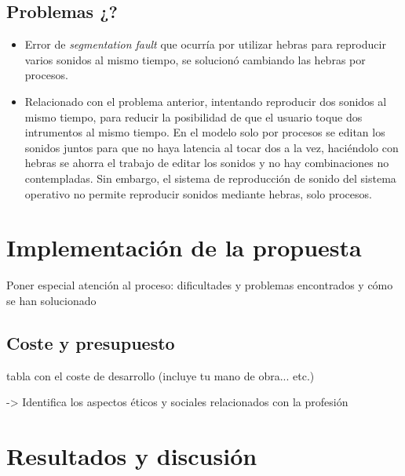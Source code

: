 \documentclass{article}
\begin{document}
 \subsection{Problemas ¿?}
 \begin{itemize}
     \item
        Error de \textit{segmentation fault} que ocurría por utilizar hebras para reproducir
        varios sonidos al mismo tiempo, se solucionó cambiando las hebras por procesos.
     \item
        Relacionado con el problema anterior, intentando reproducir dos sonidos al mismo tiempo, para reducir
        la posibilidad de que el usuario toque dos intrumentos al mismo tiempo. En el modelo solo por procesos
        se editan los sonidos juntos para que no haya latencia al tocar dos a la vez, haciéndolo con hebras se
        ahorra el trabajo de editar los sonidos y no hay combinaciones no contempladas. Sin embargo, el sistema
        de reproducción de sonido del sistema operativo no permite reproducir sonidos mediante hebras, solo
        procesos.
 \end{itemize}


\section{Implementación de la propuesta}\label{sec:Implementacion}

 Poner especial atención al proceso: dificultades y problemas encontrados y cómo se han solucionado

 \subsection{Coste y presupuesto}

  tabla con el coste de desarrollo (incluye tu mano de obra... etc.)

->  Identifica los aspectos éticos y sociales relacionados con la profesión

\section{Resultados y discusión}\label{sec:ResultadosDisc}
\end{document}
